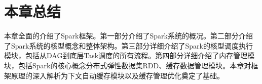 \section{本章总结}

本章全面的介绍了Spark框架。第一部分介绍了Spark系统的概况。第二部分介绍了Spark系统的核型概念和整体架构。第三部分详细介绍了Spark的核型调度执行模块，包括从DAG到底层Task调度的所有流程。第四部分详细介绍了内存管理模块，包括Spark的核心概念分布式弹性数据集RDD、缓存数据管理模块。本章对框架原理的深入解析为下文自动缓存模块以及缓存管理优化奠定了基础。





